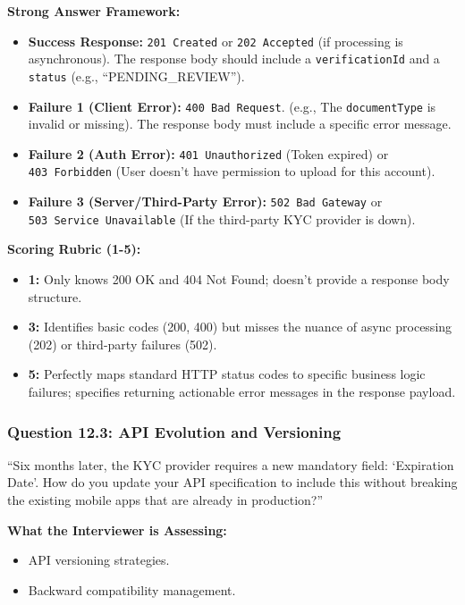 \documentclass[
  11pt,
  openany,
  oneside]{book}
\providecommand{\tightlist}{%
  \setlength{\itemsep}{0pt}\setlength{\parskip}{0pt}}
\begin{document}
\textbf{Strong Answer Framework:}

\begin{itemize}
\tightlist
\item
  \textbf{Success Response:} \texttt{201\ Created} or
  \texttt{202\ Accepted} (if processing is asynchronous). The response
  body should include a \texttt{verificationId} and a \texttt{status}
  (e.g., ``PENDING\_REVIEW'').
\item
  \textbf{Failure 1 (Client Error):} \texttt{400\ Bad\ Request}. (e.g.,
  The \texttt{documentType} is invalid or missing). The response body
  must include a specific error message.
\item
  \textbf{Failure 2 (Auth Error):} \texttt{401\ Unauthorized} (Token
  expired) or \texttt{403\ Forbidden} (User doesn't have permission to
  upload for this account).
\item
  \textbf{Failure 3 (Server/Third-Party Error):}
  \texttt{502\ Bad\ Gateway} or \texttt{503\ Service\ Unavailable} (If
  the third-party KYC provider is down).
\end{itemize}

\textbf{Scoring Rubric (1-5):}

\begin{itemize}
\tightlist
\item
  \textbf{1:} Only knows 200 OK and 404 Not Found; doesn't provide a
  response body structure.
\item
  \textbf{3:} Identifies basic codes (200, 400) but misses the nuance of
  async processing (202) or third-party failures (502).
\item
  \textbf{5:} Perfectly maps standard HTTP status codes to specific
  business logic failures; specifies returning actionable error messages
  in the response payload.
\end{itemize}

\subsubsection{Question 12.3: API Evolution and
Versioning}\label{question-12.3-api-evolution-and-versioning}

``Six months later, the KYC provider requires a new mandatory field:
`Expiration Date'. How do you update your API specification to include
this without breaking the existing mobile apps that are already in
production?''

\textbf{What the Interviewer is Assessing:}

\begin{itemize}
\tightlist
\item
  API versioning strategies.
\item
  Backward compatibility management.
\end{itemize}
\end{document}
